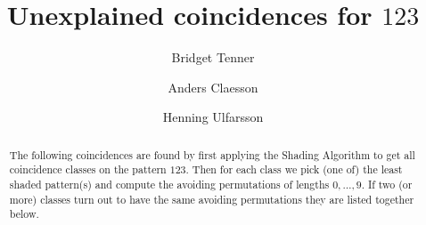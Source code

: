 \documentclass[12pt,reqno]{amsart}
\theoremstyle{plain}
\theoremstyle{definition}
\numberwithin{equation}{section}
\begin{document}
\title{Unexplained coincidences for $123$}

\author[Tenner]{Bridget Tenner}
\author[Claesson]{Anders Claesson}
\author[Ulfarsson]{Henning Ulfarsson}

\address[Tenner]{School of Computer Science, Reykjav\'ik University, Menntavegi 1, 101 Reykjav\'ik, \mbox{Iceland}}
\address[Claesson]{Department of Computer and Information Sciences, University of Strathclyde, Glasgow G1 1XH, UK}
\address[Ulfarsson]{School of Computer Science, Reykjav\'ik University, Menntavegi 1, 101 Reykjav\'ik, Iceland}



\begin{abstract}
The following coincidences are found by first applying the Shading Algorithm to
get all coincidence classes on the pattern $123$. Then for each class we pick (one of) the least shaded pattern(s)
and compute the avoiding permutations of lengths $0, \dots, 9$. If two (or more) classes turn out to have the same avoiding permutations they
are listed together below.
\end{abstract}



\maketitle
\end{document}
